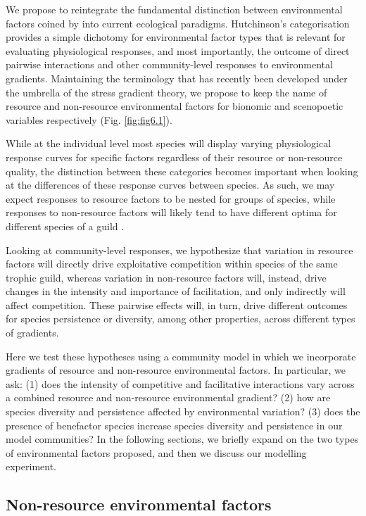 We propose to reintegrate the fundamental distinction between environmental factors coined by \cite{Hutchinson1978} into current ecological paradigms. Hutchinson’s categorisation provides a simple dichotomy for environmental factor types that is relevant for evaluating physiological responses, and most importantly, the outcome of direct pairwise interactions and other community-level responses to environmental gradients. Maintaining the terminology that has recently been developed under the umbrella of the stress gradient theory, we propose to keep the name of resource and non-resource environmental factors for bionomic and scenopoetic variables respectively (Fig. \ref{fig:fig6.1}).

While at the individual level most species will display varying physiological response curves for specific factors regardless of their resource or non-resource quality, the distinction between these categories becomes important when looking at the differences of these response curves between species. As such, we may expect responses to resource factors to be nested for groups of species, while responses to non-resource factors will likely tend to have different optima for different species of a guild \citep{Austin1990}.

Looking at community-level responses, we hypothesize that variation in resource factors will directly drive exploitative competition within species of the same trophic guild, whereas variation in non-resource factors will, instead, drive changes in the intensity and importance of facilitation, and only indirectly will affect competition. These pairwise effects will, in turn, drive different outcomes for species persistence or diversity, among other properties, across different types of gradients.

Here we test these hypotheses using a community model in which we incorporate gradients of resource and non-resource environmental factors. In particular, we ask: (1) does the intensity of competitive and facilitative interactions vary across a combined resource and non-resource environmental gradient? (2) how are species diversity and persistence affected by environmental variation? (3) does the presence of benefactor species increase species diversity and persistence in our model communities? In the following sections, we briefly expand on the two types of environmental factors proposed, and then we discuss our modelling experiment.

\subsection{Non-resource environmental factors}

